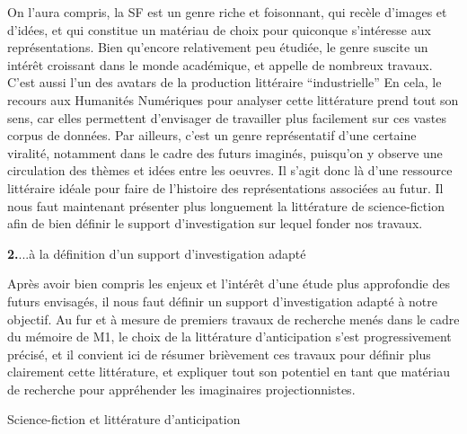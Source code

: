 \documentclass[letterpaper,portrait,12pt]{article}
\begin{document}
On l'aura compris, la SF est un genre riche et foisonnant, qui rec\`{e}le d'images et d'id\'{e}es, et qui constitue un mat\'{e}riau de choix pour quiconque s'int\'{e}resse aux repr\'{e}sentations. Bien qu'encore relativement peu \'{e}tudi\'{e}e, le genre suscite un int\'{e}r\^{e}t croissant dans le monde acad\'{e}mique, et appelle de nombreux travaux. C'est aussi l'un des avatars de la production litt\'{e}raire {``}industrielle'' En cela, le recours aux Humanit\'{e}s Num\'{e}riques pour analyser cette litt\'{e}rature prend tout son sens, car elles permettent d'envisager de travailler plus facilement sur ces vastes corpus de donn\'{e}es. Par ailleurs, c'est un genre repr\'{e}sentatif d'une certaine viralit\'{e}, notamment dans le cadre des futurs imagin\'{e}s, puisqu'on y observe une circulation des th\`{e}mes et id\'{e}es entre les oeuvres. Il s'agit donc l\`{a} d'une ressource litt\'{e}raire id\'{e}ale pour faire de l'histoire des repr\'{e}sentations associ\'{e}es au futur. Il nous faut maintenant pr\'{e}senter plus longuement la litt\'{e}rature de science-fiction afin de bien d\'{e}finir le support d'investigation sur lequel fonder nos travaux.








\textbf{{\Large 2.}}{\Large  ...\`{a} la d\'{e}finition d'un support d'investigation adapt\'{e}}








	Apr\`{e}s avoir bien compris les enjeux et l'int\'{e}r\^{e}t d'une \'{e}tude plus approfondie des futurs envisag\'{e}s, il nous faut d\'{e}finir un support d'investigation adapt\'{e} \`{a} notre objectif. Au fur et \`{a} mesure de premiers travaux de recherche men\'{e}s dans le cadre du m\'{e}moire de M1, le choix de la litt\'{e}rature d'anticipation s'est progressivement pr\'{e}cis\'{e}, et il convient ici de r\'{e}sumer bri\`{e}vement ces travaux pour d\'{e}finir plus clairement cette litt\'{e}rature, et expliquer tout son potentiel en tant que mat\'{e}riau de recherche pour appr\'{e}hender les imaginaires projectionnistes.








	Science-fiction et litt\'{e}rature d'anticipation
\end{document}
